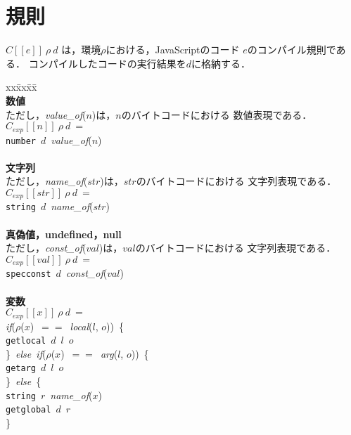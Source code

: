 \documentclass[a4j,12pt]{jarticle}
\begin{document}
\section{規則}
$C[[e]]\ \rho\ d $ は，環境$\rho$における，JavaScriptのコード
$e$のコンパイル規則である．
コンパイルしたコードの実行結果を$d$に格納する．
\footnotesize{
\begin{tabbing}
xx\=xx\=xx\=\kill \\
\textbf{数値} \\
ただし，\textit{value\_of}($n$)は，$n$のバイトコードにおける
数値表現である．\\
\>$ C_{exp}[[n]]\ \rho\ d\ = $ \\
\>\>\texttt{number}\  $d$\  \textit{value\_of}($n$) \\
\\
\textbf{文字列} \\
ただし，\textit{name\_of}($str$)は，$str$のバイトコードにおける
文字列表現である．\\
\>$ C_{exp}[[str]]\ \rho\ d\ = $ \\
\>\>\texttt{string}\ $d$\ \textit{name\_of}($str$) \\
\\
\textbf{真偽値，undefined，null} \\
ただし，\textit{const\_of}($val$)は，$val$のバイトコードにおける
文字列表現である．\\
\>$ C_{exp}[[val]]\ \rho\ d\ =$ \\
\>\>\texttt{specconst}\ $d$\ \textit{const\_of}($val$) \\
\\

\textbf{変数} \\
\>$C_{exp}[[x]]\ \rho\ d\ =$ \\
\>\>\textit{if}($\rho$($x$)\ $==$\ \textit{local}($l$, $o$))\ \{ \\
\>\>\>\texttt{getlocal}\ $d$\ $l$\ $o$ \\
\>\>\}\ \textit{else\ if}($\rho$($x$)\ $==$\ \textit{arg}($l$, $o$))\ \{ \\
\>\>\>\texttt{getarg}\ $d$\ $l$\ $o$ \\
\>\>\}\ \textit{else}\ \{ \\
\>\>\>\texttt{string}\ $r$\ \textit{name\_of}($x$) \\
\>\>\>\texttt{getglobal}\ $d$\ $r$ \\
\>\>\} \\
\\


\end{tabbing}}
\end{document}
